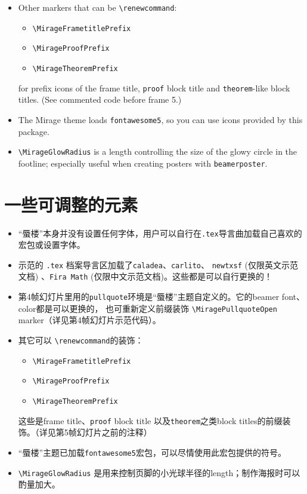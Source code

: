 \documentclass{article}
\begin{document}
\begin{paracol}{2}
\begin{itemize}
\item  Other markers that can be \verb|\renewcommand|:
\begin{itemize}[nosep]
  \item \verb|\MirageFrametitlePrefix|
  \item \verb|\MirageProofPrefix| 
  \item \verb|\MirageTheoremPrefix|
\end{itemize} 
for prefix icons of the frame title, \texttt{proof} block title and \texttt{theorem}-like block titles. (See commented code before frame 5.)

\item The Mirage theme loads \texttt{fontawesome5}, so you can use
icons provided by this package.

\item \verb|\MirageGlowRadius| is a length controlling the size of the glowy circle in the footline; especially useful when creating posters with \texttt{beamerposter}.
\end{itemize}

\switchcolumn

\section{一些可调整的元素}
\begin{itemize}
\item “蜃楼”本身并没有设置任何字体，用户可以自行在\texttt{.tex}导言曲加载自己喜欢的宏包或设置字体。

\item  示范的 \texttt{.tex} 档案导言区加载了\texttt{caladea}、\texttt{carlito}、 \texttt{newtxsf} (仅限英文示范文档) 、\texttt{Fira Math} (仅限中文示范文档)。这些都是可以自行更换的！

\item 第4帧幻灯片里用的\texttt{pullquote}环境是“蜃楼”主题自定义的。它的beamer font、color都是可以更换的， 也可重新定义前缀装饰 \verb|\MiragePullquoteOpen| marker（详见第4帧幻灯片示范代码）。

\item  其它可以 \verb|\renewcommand|的装饰：
\begin{itemize}[nosep]
    \item \verb|\MirageFrametitlePrefix|
    \item \verb|\MirageProofPrefix|
    \item \verb|\MirageTheoremPrefix| 
\end{itemize} 
这些是frame title、\texttt{proof} block title 以及\texttt{theorem}之类block titles的前缀装饰。（详见第5帧幻灯片之前的注释）

\item “蜃楼”主题已加载\texttt{fontawesome5}宏包，可以尽情使用此宏包提供的符号。

\item \verb|\MirageGlowRadius| 是用来控制页脚的小光球半径的length；制作海报时可以酌量加大。
\end{itemize}

\end{paracol}
\end{document}
